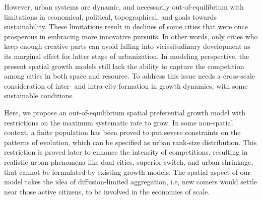 \documentclass[reprint,unsortedaddress,amsmath,amssymb,aps,prl,showkeys]{revtex4-2}
\begin{document}

However, urban systems are dynamic, and necessarily out-of-equilibrium with limitations in economical, political, topographical, and goals towards sustainability. These limitations result in declines of some cities that were once prosperous in embracing more innovative pursuits\cite{batty2017urban}. In other words, only cities who keep enough creative parts can avoid falling into vicissitudinary
development as its marginal effect for latter
stage of urbanization\cite{atkinson2012urban, girardin2009quantifying,gomez2018explaining,parris2003characterizing,batty2008size}. In modeling perspective, the present spatial growth models still lack the ability to capture the competition among cities in both space and resource. To address this issue needs a cross-scale consideration of inter- and intra-city formation in growth dynamics, with some sustainable conditions.



Here, we propose an out-of-equilibrium spatial preferential growth model with restrictions on the maximum systematic rate to grow. In some non-spatial context\cite{PhysRevE.55.R3817}, a finite population has been proved to put severe constraints on the patterns of  evolution, which can be specified as urban rank-size distribution. This restriction is proved later to enhance the intensity of competitions, resulting in realistic urban phenomena like dual cities\cite{silverman2018rethinking}, superior switch\cite{gabaix2004evolution}, and urban shrinkage\cite{haase2014conceptualizing}, that cannot be formulated by existing growth models. The spatial aspect of our model takes the idea of diffusion-limited aggregation\cite{makse1995modelling, rybski2013distance, kleinberg2000navigation}, i.e, new comers would settle near those active citizens, to be involved in the economies of scale.
\end{document}
